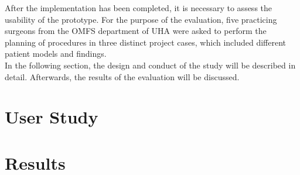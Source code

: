 After the implementation has been completed, it is necessary to assess the usability of the prototype.
For the purpose of the evaluation, five practicing surgeons from the
OMFS department of UHA were asked to perform the planning of procedures 
in three distinct project cases, which included different patient models 
and findings.
\\ In the following section, the design and conduct of the study will be described in detail.
Afterwards, the results of the evaluation will be discussed. 

\section{\label{sec::Methology}User Study}

\section{\label{sec::Results}Results}
